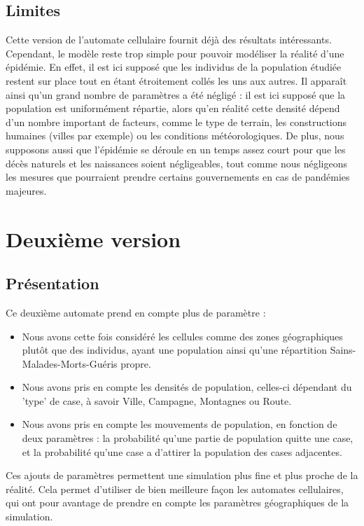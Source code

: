 \documentclass{article}
\begin{document}
\subsection{Limites}
	Cette version de l'automate cellulaire fournit déjà des résultats intéressants. Cependant, le modèle reste trop simple pour pouvoir modéliser la réalité d'une épidémie. En effet, il est ici supposé que les individus de la population étudiée restent sur place tout en étant étroitement collés les uns aux autres.
Il apparaît ainsi qu'un grand nombre de paramètres a été négligé : il est ici supposé que la population est uniformément répartie, alors qu'en réalité cette densité dépend d'un nombre important de facteurs, comme le type de terrain, les constructions humaines (villes par exemple) ou les conditions météorologiques. De plus, nous supposons aussi que l'épidémie se déroule en un temps assez court pour que les décès naturels et les naissances soient négligeables, tout comme nous négligeons les mesures que pourraient prendre certains gouvernements en cas de pandémies majeures.
	
	
	
\section{Deuxième version}

\subsection{Présentation}
	Ce deuxième automate prend en compte plus de paramètre : 
	\begin{itemize}
	\item Nous avons cette fois considéré les cellules comme des zones géographiques plutôt que des individus, ayant une population ainsi qu'une répartition Sains-Malades-Morts-Guéris propre.
	\item Nous avons pris en compte les densités de population, celles-ci dépendant du 'type' de case, à savoir Ville, Campagne, Montagnes ou Route.
	\item Nous avons pris en compte les mouvements de population, en fonction de deux paramètres : la probabilité qu'une partie de population quitte une case, et la probabilité qu'une case a d'attirer la population des cases adjacentes.
	\end{itemize}
	
	Ces ajouts de paramètres permettent une simulation plus fine et plus proche de la réalité. Cela permet d'utiliser de bien meilleure façon les automates cellulaires, qui ont pour avantage de prendre en compte les paramètres géographiques de la simulation.
\end{document}
